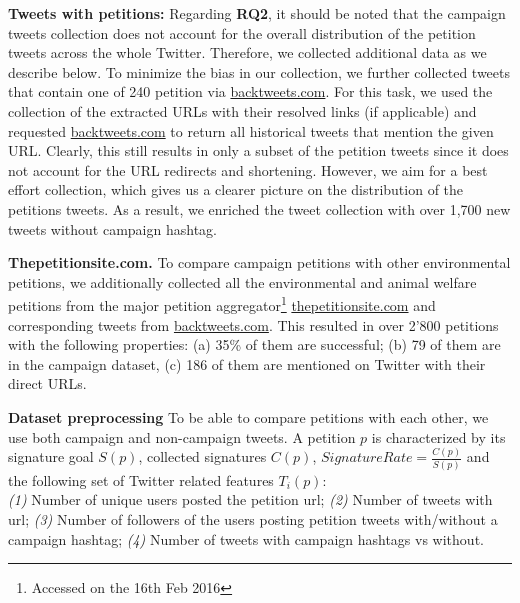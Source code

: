 \textbf{Tweets with petitions:}
Regarding \textbf{RQ2},
it should be noted that the campaign tweets collection does not account for the overall distribution of the petition tweets across the whole Twitter. 
Therefore, we collected additional data as we describe below.
To minimize the bias in our collection, we further collected tweets that contain one of 240 petition via \url{backtweets.com}. For this task, we used the collection of the extracted URLs with their resolved links (if applicable) and requested \url{backtweets.com} to return all historical tweets that mention the given URL.
Clearly, this still results in only a subset of the petition tweets since it does not account for the URL redirects and shortening. However, we aim for a best effort collection, which gives us a clearer picture on the distribution of the petitions tweets.
As a result, we enriched the tweet collection with over 1,700 new tweets without campaign hashtag.

\textbf{Thepetitionsite.com.} To compare campaign petitions with other environmental petitions, we additionally collected all the environmental and animal welfare petitions from the major petition aggregator\footnote{Accessed on the 16th Feb 2016} \url{thepetitionsite.com} and corresponding tweets from \url{backtweets.com}. This resulted in over 2'800 petitions with the following properties: (a) 35\% of them are successful; (b) 79 of them are in the campaign dataset, (c) 186 of them are mentioned on Twitter with their direct URLs.

\textbf{Dataset preprocessing}
To be able to compare petitions with each other, we use both campaign and non-campaign tweets.
A petition $p$ is characterized by its signature goal $S(p)$, collected signatures $C(p)$, $SignatureRate = \frac{C(p)}{S(p)}$ and the following set of Twitter related features $T_i(p)$:\\
\textit{(1)} Number of unique users posted the petition url; 
\textit{(2)} Number of tweets with url;
\textit{(3)} Number of followers of the users posting petition tweets with/without a campaign hashtag;
\textit{(4)} Number of tweets with campaign hashtags vs without.